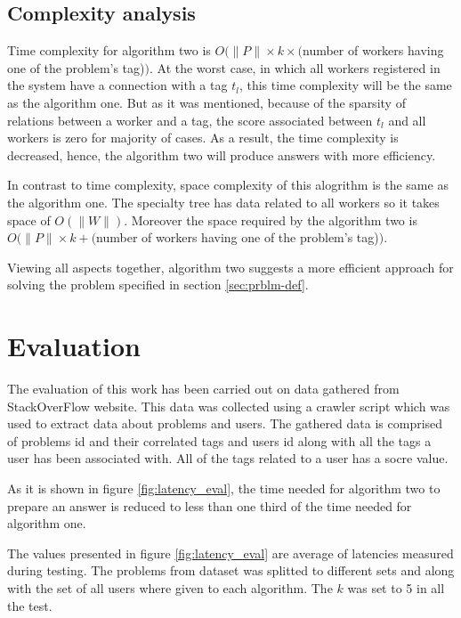 \documentclass{template}
\begin{document}
\subsection{Complexity analysis}
Time complexity for algorithm two is 
\(O(\lVert P \rVert \times k \times (\)number of workers having one of the problem's tag)\()\).
At the worst case, in which all workers registered in the system have a connection with a tag \(t_l\),
this time complexity will be the same as the algorithm one. But as it was mentioned, because of the 
sparsity of relations between a worker and a tag, the score associated between \(t_l\) and all
workers is zero for majority of cases. As a result, the time complexity is decreased, hence, the 
algorithm two will produce answers with more efficiency.

In contrast to time complexity, space complexity of this alogrithm is the same as the algorithm one.
The specialty tree has data related to all workers so it takes space of \(O(\lVert W \rVert)\). 
Moreover the space required by the algorithm two is
\(O(\lVert P \rVert \times k + (\)number of workers having one of the problem's tag)\()\).

Viewing all aspects together, algorithm two suggests a more efficient approach for
solving the problem specified in section \ref{sec:prblm-def}.

\section{Evaluation}
\label{sec:eval}
The evaluation of this work has been carried out on data gathered from StackOverFlow website.
This data was collected using a crawler script which was used to extract data about problems
and users. The gathered data is comprised of problems id and their correlated tags and users id along
with all the tags a user has been associated with. All of the tags related to a user has a socre value.

As it is shown in figure \ref{fig:latency_eval}, the time needed for algorithm two to prepare 
an answer is reduced to less than one third of the time needed for algorithm one.

The values presented in figure \ref{fig:latency_eval} are average of latencies measured during testing.
The problems from dataset was splitted to different sets and along with the set of all users where 
given to each algorithm. The \(k\) was set to 5 in all the test.
\end{document}
